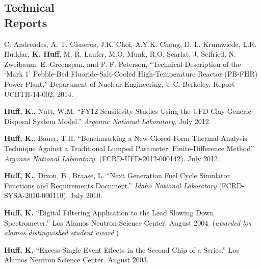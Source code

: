 \documentclass[margin,line]{resume}
\begin{document}
\begin{resume}
    \section{\mysidestyle Technical\\Reports}
    \begin{bibenum}
      \item C. Andreades, A. T. Cisneros, J.K. Choi, A.Y.K. Chong, D. L.  
      Krumwiede, L.R. Huddar, \textbf{K. Huff}, M. R. Laufer, M.O. Munk, R.O. 
      Scarlat, J. Seifried, N. Zweibaum, E. Greenspan, and P. F. Peterson, 
      ``Technical Description of the ‘Mark 1’ Pebble-Bed Fluoride-Salt-Cooled 
      High-Temperature Reactor (PB-FHR) Power Plant,'' Department of Nuclear 
      Engineering, U.C. Berkeley, Report UCBTH-14-002, 2014.  
      \item \textbf{Huff, K.}, Nutt, W.M. ``FY12 Sensitivity Studies Using the UFD Clay Generic Disposal System Model.'' 
        \emph{Argonne National Laboratory}. July 2012.
      \item \textbf{Huff, K.}, Bauer, T.H. ``Benchmarking a New Closed-Form Thermal Analysis Technique Against a Traditional
        Lumped Parameter, Finite-Difference Method'' \emph{Argonne National Laboratory}. (FCRD-UFD-2012-000142). July 2012.
      \item \textbf{Huff, K.}, Dixon, B., Braase, L. ``Next Generation Fuel Cycle Simulator Functions and Requirements Document.'' 
        \emph{Idaho National Laboratory} (FCRD-SYSA-2010-000110). July 2010. 
      \item \textbf{Huff, K.} ``Digital Filtering Application to the Lead Slowing Down 
        Spectrometer.'' Los Alamos Neutron Science Center. August 2004.  %
        (\emph{awarded los alamos distinguished student award.}) 
      \item \textbf{Huff, K.} ``Excess Single Event Effects in the Second Chip of a Series.'' 
        Los Alamos Neutron Science Center. August 2003. 
    \end{bibenum}

\end{resume}
\end{document}
